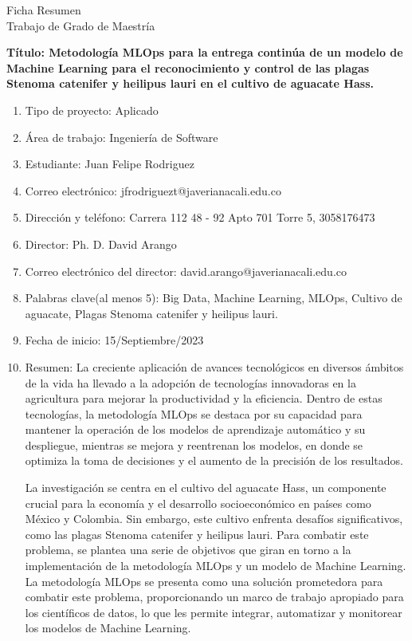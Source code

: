 \thispagestyle{empty}
\begin{center}
    \Large{Ficha Resumen \\ Trabajo de Grado de Maestría}
\end{center}

\textbf{Título: Metodología MLOps para la entrega continúa de un modelo de Machine Learning para el reconocimiento y control de las plagas Stenoma catenifer y heilipus lauri en el cultivo de aguacate Hass.}
\begin{enumerate}
    \item Tipo de proyecto: Aplicado
    \item Área de trabajo: Ingeniería de Software
    \item Estudiante: Juan Felipe Rodriguez
    \item Correo electrónico: jfrodriguezt@javerianacali.edu.co
    \item Dirección y teléfono: Carrera 112 48 - 92 Apto 701 Torre 5, 3058176473
    \item Director: Ph. D. David Arango
    \item Correo electrónico del director: david.arango@javerianacali.edu.co
    \item Palabras clave(al menos 5): Big Data, Machine Learning, MLOps, Cultivo de aguacate, Plagas Stenoma catenifer y heilipus lauri.
    \item Fecha de inicio: 15/Septiembre/2023
    \item Resumen: La creciente aplicación de avances tecnológicos en diversos ámbitos de la vida ha llevado a la adopción de tecnologías innovadoras en la agricultura para mejorar la productividad y la eficiencia. Dentro de estas tecnologías, la metodología MLOps se destaca por su capacidad para mantener la operación de los modelos de aprendizaje automático y su despliegue, mientras se mejora y reentrenan los modelos, en donde se optimiza la toma de decisiones y el aumento de la precisión de los resultados.
\newpage
\thispagestyle{empty}

    La investigación se centra en el cultivo del aguacate Hass, un componente crucial para la economía y el desarrollo socioeconómico en países como México y Colombia. Sin embargo, este cultivo enfrenta desafíos significativos, como las plagas Stenoma catenifer y heilipus lauri. Para combatir este problema, se plantea una serie de objetivos que giran en torno a la implementación de la metodología MLOps y un modelo de Machine Learning. La metodología MLOps se presenta como una solución prometedora para combatir este problema, proporcionando un marco de trabajo apropiado para los científicos de datos, lo que les permite integrar, automatizar y monitorear los modelos de Machine Learning.


\end{enumerate}

